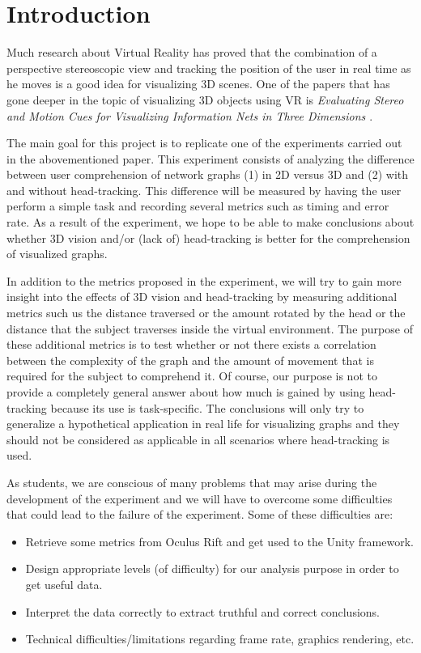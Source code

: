 \chapter{Introduction}

Much research about Virtual Reality has proved that the combination of a
perspective stereoscopic view and tracking the position of
the user in real time as he moves is a good idea for visualizing 3D scenes. One of the
papers that has gone deeper in the topic of visualizing 3D objects using
VR is \emph{Evaluating Stereo and Motion Cues for Visualizing
Information Nets in Three Dimensions \cite{ware1996evaluating}}.

The main goal for this project is to replicate one of the experiments
carried out in the abovementioned paper. This experiment consists of
analyzing the difference between user comprehension of network graphs
(1) in 2D versus 3D and (2) with and without head-tracking. This
difference will be measured by having the user perform a simple task and
recording several metrics such as timing and error rate. As a result of
the experiment, we hope to be able to make conclusions about whether 3D
vision and/or (lack of) head-tracking is better for the comprehension of
visualized graphs.

In addition to the metrics proposed in the experiment, we will try to
gain more insight into the effects of 3D vision and head-tracking by
measuring additional metrics such us the distance traversed or the
amount rotated by the head or the distance that the subject traverses
inside the virtual environment. The purpose of these additional metrics
is to test whether or not there exists a correlation between the
complexity of the graph and the amount of movement that is required for
the subject to comprehend it. Of course, our purpose is not to provide a
completely general answer about how much is gained by using
head-tracking because its use is task-specific. The conclusions will
only try to generalize a hypothetical application in real life for
visualizing graphs and they should not be considered as applicable in
all scenarios where head-tracking is used.

As students, we are conscious of many problems that may arise during the
development of the experiment and we will have to overcome some
difficulties that could lead to the failure of the experiment. Some of
these difficulties are:

\begin{itemize}
\item
  Retrieve some metrics from Oculus Rift and get used to the Unity
  framework.
\item
  Design appropriate levels (of difficulty) for our analysis purpose in
  order to get useful data.
\item
  Interpret the data correctly to extract truthful and correct
  conclusions.
\item
  Technical difficulties/limitations regarding frame rate, graphics
  rendering, etc.
\end{itemize}


